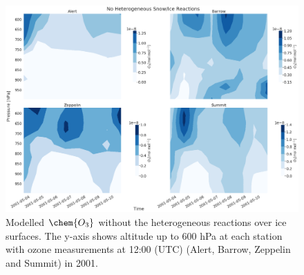 \begin{figure}
    \centering
    \includegraphics[width = \linewidth]{Chapter6_Results/images/noSnowIce_2001_o3.png}
    \caption{Modelled $\chem{O_3}$ without the heterogeneous reactions over ice surfaces. The y-axis shows altitude up to 600 hPa at each station with ozone measurements at 12:00 (UTC) (Alert, Barrow, Zeppelin and Summit) in 2001.}
    \label{fig:vert_noSnowIce_o3_2001}
\end{figure}